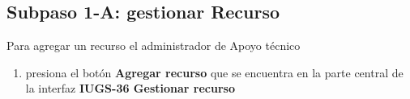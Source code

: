\subsection{Subpaso 1-A: gestionar Recurso}	
	Para agregar un recurso el administrador de Apoyo técnico
	\begin{enumerate}
		\item presiona el botón \textbf{Agregar recurso} que se encuentra en 
		la parte central de la interfaz 
		\textbf{IUGS-36 Gestionar recurso}
	\end{enumerate}
		

	
	